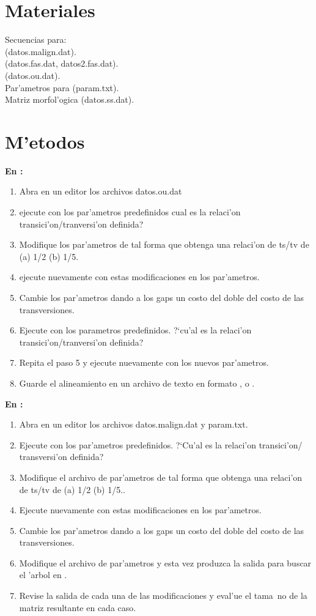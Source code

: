\section{Materiales}
\noindent
Secuencias para:\\
 (datos.malign.dat).\\
 (datos.fas.dat, datos2.fas.dat).\\
 (datos.ou.dat).\\
Par'ametros para  (param.txt).\\
Matriz morfol'ogica (datos.ss.dat).
\section{M'etodos}
\noindent
\textbf{En :}
\begin{enumerate}
\item Abra en un editor los archivos datos.ou.dat
\item   ejecute  con los par'ametros predefinidos cual es la relaci'on transici'on/tranversi'on definida?
\item   Modifique los par'ametros de tal forma que obtenga una relaci'on de ts/tv de (a) 1/2 (b) 1/5.
\item   ejecute nuevamente  con estas modificaciones en los par'ametros.
\item   Cambie los par'ametros dando a los gaps un costo del doble del costo de las transversiones.
\item  Ejecute  con los parametros predefinidos. ?`cu'al es la relaci'on transici'on/tranversi'on definida?
\item   Repita el paso 5 y ejecute nuevamente  con los nuevos par'ametros.
\item    Guarde el alineamiento en un archivo de texto en formato ,  o .
\end{enumerate}


\textbf{En :}

\begin{enumerate}
\item Abra en un editor los archivos datos.malign.dat y param.txt.
\item Ejecute  con los par'ametros predefinidos. ?`Cu'al es la relaci'on transici'on/ transversi'on definida?
\item Modifique el archivo de par'ametros de tal forma que obtenga una relaci'on de ts/tv de (a) 1/2 (b) 1/5..
\item Ejecute nuevamente  con estas modificaciones en los par'ametros.
\item Cambie los par'ametros dando a los gaps un costo del doble del costo de las transversiones.
\item Modifique el archivo de par'ametros y esta vez produzca la salida para buscar el 'arbol en .
\item Revise la salida de cada una de las modificaciones y eval'ue el tama~no de la matriz resultante en cada caso.
\end{enumerate}

